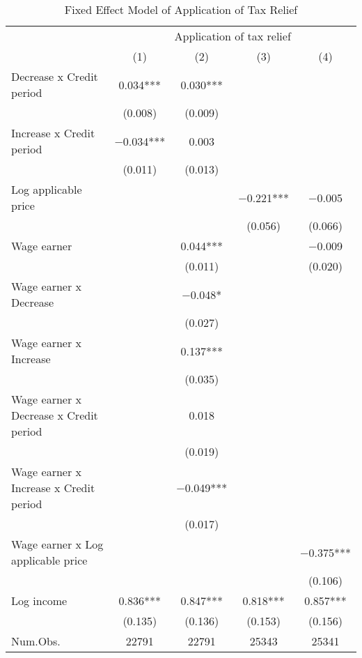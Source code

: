
\begin{landscape}\begin{table}

\caption{Fixed Effect Model of Application of Tax Relief\label{tab:fe-application}}
\centering
\fontsize{8}{10}\selectfont
\begin{threeparttable}
\begin{tabular}[t]{lcccc}
\toprule
\multicolumn{1}{c}{ } & \multicolumn{4}{c}{Application of tax relief} \\
\cmidrule(l{3pt}r{3pt}){2-5}
  & (1) & (2) & (3) & (4)\\
\midrule
Decrease x Credit period & \num{0.034}*** & \num{0.030}*** &  & \\
 & (\num{0.008}) & (\num{0.009}) &  & \\
Increase x Credit period & \num{-0.034}*** & \num{0.003} &  & \\
 & (\num{0.011}) & (\num{0.013}) &  & \\
Log applicable price &  &  & \num{-0.221}*** & \num{-0.005}\\
 &  &  & (\num{0.056}) & (\num{0.066})\\
Wage earner &  & \num{0.044}*** &  & \num{-0.009}\\
 &  & (\num{0.011}) &  & (\num{0.020})\\
Wage earner x Decrease &  & \num{-0.048}* &  & \\
 &  & (\num{0.027}) &  & \\
Wage earner x Increase &  & \num{0.137}*** &  & \\
 &  & (\num{0.035}) &  & \\
Wage earner x Decrease x Credit period &  & \num{0.018} &  & \\
 &  & (\num{0.019}) &  & \\
Wage earner x Increase x Credit period &  & \num{-0.049}*** &  & \\
 &  & (\num{0.017}) &  & \\
Wage earner x Log applicable price &  &  &  & \num{-0.375}***\\
 &  &  &  & (\num{0.106})\\
Log income & \num{0.836}*** & \num{0.847}*** & \num{0.818}*** & \num{0.857}***\\
 & (\num{0.135}) & (\num{0.136}) & (\num{0.153}) & (\num{0.156})\\
\midrule
Num.Obs. & \num{22791} & \num{22791} & \num{25343} & \num{25341}\\
\bottomrule
\end{tabular}

\end{threeparttable}
\end{table}
\end{landscape}
